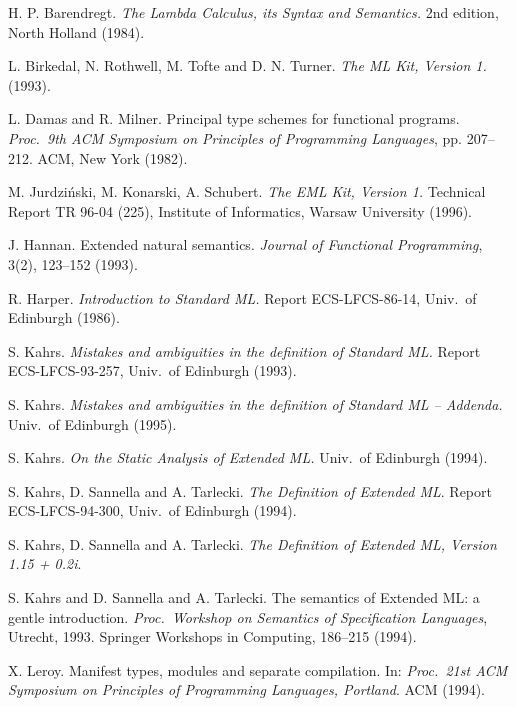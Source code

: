 
\begin{thebibliography}{10}


 H. P. Barendregt. 
{\it The Lambda Calculus, its Syntax and Semantics.} 
2nd edition, North Holland (1984).

 L. Birkedal, N. Rothwell, M. Tofte and D. N. Turner. 
{\it The ML Kit, Version 1.} (1993).

 L. Damas and R. Milner.
Principal type schemes for functional programs.
{\it Proc.\ 9th ACM Symposium on Principles of 
Programming Languages}, pp. 207--212. ACM, New York (1982).

 M. Jurdzi\'nski, M. Konarski, A. Schubert.
{\it The EML Kit, Version 1.} 
Technical Report TR 96-04 (225), 
Institute of Informatics, Warsaw University (1996). 
  
 J. Hannan.
Extended natural semantics.
{\it Journal of Functional Programming},
3(2), 123--152 (1993).
        
 R. Harper.
{\it Introduction to Standard ML.}  
Report ECS-LFCS-86-14, Univ.~of Edinburgh (1986).

 S. Kahrs.
{\it Mistakes and ambiguities in the definition of Standard ML.}
Report ECS-LFCS-93-257, Univ.~of Edinburgh (1993).

 S. Kahrs.
{\it Mistakes and ambiguities in the definition of Standard ML -- Addenda.}
Univ.~of Edinburgh (1995).

 S. Kahrs.
{\it On the Static Analysis of Extended ML.}
Univ.~of Edinburgh (1994).

 S. Kahrs, D. Sannella and A. Tarlecki.
{\it The Definition of Extended ML}.
Report ECS-LFCS-94-300, Univ.~of Edinburgh (1994).

 S. Kahrs, D. Sannella and A. Tarlecki.
{\it The Definition of Extended ML, Version 1.15 + 0.2i}.

 S. Kahrs and D. Sannella and A. Tarlecki.
The semantics of Extended ML: a gentle introduction.
{\it Proc.\ Workshop on Semantics of Specification Languages},
Utrecht, 1993. Springer Workshops in Computing, 186--215 (1994).

 X. Leroy.
Manifest types, modules and separate compilation. In:
{\it Proc.\ 21st ACM Symposium on Principles of 
Programming Languages, Portland}. ACM (1994).


\end{thebibliography}
